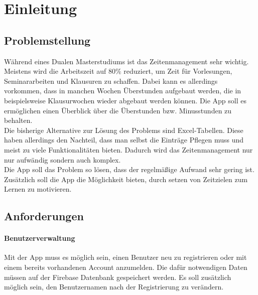 \section{Einleitung}\label{sec:einleitung}
\subsection{Problemstellung}
Während eines Dualen Masterstudiums ist das Zeitenmanagement sehr wichtig. Meistens wird die 
Arbeitszeit auf 80\% reduziert, um Zeit für Vorlesungen, Seminararbeiten und Klausuren zu schaffen. 
Dabei kann es allerdings vorkommen, dass in manchen Wochen Überstunden aufgebaut werden, die in beispielsweise
Klausurwochen wieder abgebaut werden können. Die App soll es ermöglichen einen Überblick über die 
Überstunden bzw. Minusstunden zu behalten.\\
Die bisherige Alternative zur Lösung des Problems sind Excel-Tabellen. Diese haben allerdings den Nachteil,
dass man selbst die Einträge Pflegen muss und meist zu viele Funktionalitäten bieten. Dadurch wird das Zeitenmanagement
nur nur aufwändig sondern auch komplex. \\
Die App soll das Problem so lösen, dass der regelmäßige Aufwand sehr gering ist. Zusätzlich soll die App die Möglichkeit bieten, 
durch setzen von Zeitzielen zum Lernen zu motivieren.

\subsection{Anforderungen}
\paragraph{Benutzerverwaltung}
Mit der App muss es möglich sein, einen Benutzer neu zu registrieren oder mit einem bereits 
vorhandenen Account anzumelden. 
Die dafür notwendigen Daten müssen auf der Firebase Datenbank gespeichert werden.
Es soll zusätzlich möglich sein, den Benutzernamen nach der Registrierung zu verändern. 
